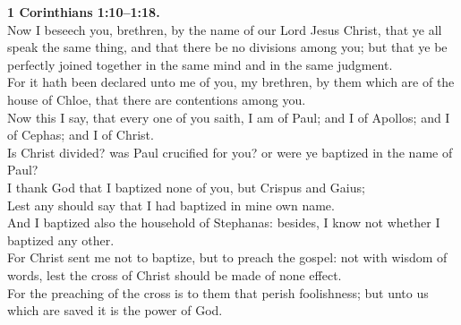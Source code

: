 \documentclass[10pt]{article} %
\begin{document}
{\begin{minipage}[t]{0.45\textwidth}
\textbf{1 Corinthians 1:10--1:18.}\\
Now I beseech you, brethren, by the name of our Lord Jesus Christ, that ye all speak the same thing, and that there be no divisions among you; but that ye be perfectly joined together in the same mind and in the same judgment.\\
For it hath been declared unto me of you, my brethren, by them which are of the house of Chloe, that there are contentions among you.\\
Now this I say, that every one of you saith, I am of Paul; and I of Apollos; and I of Cephas; and I of Christ.\\
Is Christ divided? was Paul crucified for you? or were ye baptized in the name of Paul?\\
I thank God that I baptized none of you, but Crispus and Gaius;\\
Lest any should say that I had baptized in mine own name.\\
And I baptized also the household of Stephanas: besides, I know not whether I baptized any other.\\
For Christ sent me not to baptize, but to preach the gospel: not with wisdom of words, lest the cross of Christ should be made of none effect.\\
For the preaching of the cross is to them that perish foolishness; but unto us which are saved it is the power of God.\\

\end{minipage}}
\vspace*{\fill}
\newpage
\Huge%
\vspace*{\fill}
\begin{spacing}{1.3}%
\end{spacing}
\vspace*{\fill}
\end{document}
